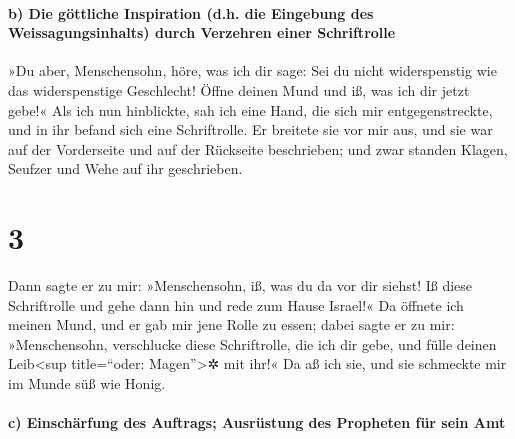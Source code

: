\hypertarget{b-die-guxf6ttliche-inspiration-d.h.-die-eingebung-des-weissagungsinhalts-durch-verzehren-einer-schriftrolle}{%
\paragraph{b) Die göttliche Inspiration (d.h. die Eingebung des
Weissagungsinhalts) durch Verzehren einer
Schriftrolle}\label{b-die-guxf6ttliche-inspiration-d.h.-die-eingebung-des-weissagungsinhalts-durch-verzehren-einer-schriftrolle}}

»Du aber, Menschensohn, höre, was ich dir sage: Sei du
nicht widerspenstig wie das widerspenstige Geschlecht! Öffne deinen Mund
und iß, was ich dir jetzt gebe!« Als ich nun hinblickte,
sah ich eine Hand, die sich mir entgegenstreckte, und in ihr befand sich
eine Schriftrolle. Er breitete sie vor mir aus, und sie
war auf der Vorderseite und auf der Rückseite beschrieben; und zwar
standen Klagen, Seufzer und Wehe auf ihr geschrieben.

\hypertarget{section-2}{%
\section{3}\label{section-2}}

Dann sagte er zu mir: »Menschensohn, iß, was du da vor dir
siehst! Iß diese Schriftrolle und gehe dann hin und rede zum Hause
Israel!« Da öffnete ich meinen Mund, und er gab mir jene
Rolle zu essen; dabei sagte er zu mir: »Menschensohn,
verschlucke diese Schriftrolle, die ich dir gebe, und fülle deinen
Leib\textless sup title=``oder: Magen''\textgreater✲ mit ihr!« Da aß ich
sie, und sie schmeckte mir im Munde süß wie Honig.

\hypertarget{c-einschuxe4rfung-des-auftrags-ausruxfcstung-des-propheten-fuxfcr-sein-amt}{%
\paragraph{c) Einschärfung des Auftrags; Ausrüstung des Propheten für
sein
Amt}\label{c-einschuxe4rfung-des-auftrags-ausruxfcstung-des-propheten-fuxfcr-sein-amt}}


